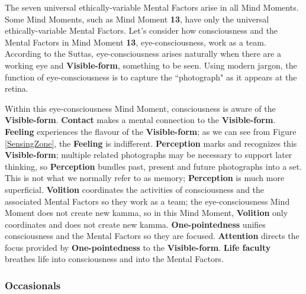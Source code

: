 The seven universal ethically-variable Mental Factors arise in all Mind Moments. Some Mind Moments, such as Mind Moment \textbf{13}, have only the universal ethically-variable Mental Factors. Let’s consider how consciousness and the Mental Factors in Mind Moment \textbf{13}, eye-consciousness, work as a team. According to the Suttas, eye-consciousness arises naturally when there are a working eye and \textbf{Visible-form}, something to be seen. Using modern jargon, the function of eye-consciousness is to capture the ``photograph" as it appears at the retina.

Within this eye-consciousness Mind Moment, consciousness is aware of the \textbf{Visible-form}. \textbf{Contact} makes a mental connection to the \textbf{Visible-form}. \textbf{Feeling} experiences the flavour of the \textbf{Visible-form}; as we can see from Figure \ref{SensingZone}, the \textbf{Feeling} is indifferent. \textbf{Perception} marks and recognizes this \textbf{Visible-form}; multiple related photographs may be necessary to support later thinking, so \textbf{Perception} bundles past, present and future photographs into a set. This is not what we normally refer to as memory; \textbf{Perception} is much more superficial. \textbf{Volition} coordinates the activities of consciousness and the associated Mental Factors so they work as a team; the eye-consciousness Mind Moment does not create new kamma, so in this Mind Moment, \textbf{Volition} only coordinates and does not create new kamma. \textbf{One-pointedness} unifies consciousness and the Mental Factors so they are focused. \textbf{Attention} directs the focus provided by \textbf{One-pointedness} to the \textbf{Visible-form}. \textbf{Life faculty} breathes life into consciousness and into the Mental Factors. 

\subsubsection*{Occasionals}

